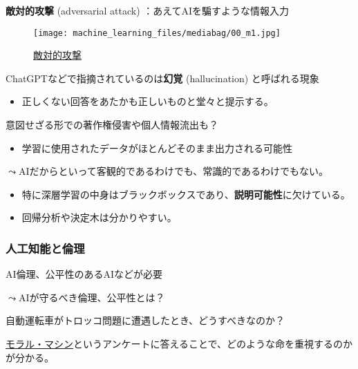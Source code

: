 \documentclass[
  xelatex,
  ja=standard]{bxjsarticle}
\providecommand{\tightlist}{%
  \setlength{\itemsep}{0pt}\setlength{\parskip}{0pt}}\usepackage{longtable,booktabs,array}
\begin{document}
\textbf{敵対的攻撃} (adversarial attack) ：あえてAIを騙すような情報入力

\begin{figure}[htpb]

{\centering \texttt{[image: machine\_learning\_files/mediabag/00\_m1.jpg]}

}

\caption{\href{https://gigazine.net/news/20211130-universal-naturalistic-adversarial-patches/}{敵対的攻撃}}

\end{figure}

ChatGPTなどで指摘されているのは\textbf{幻覚} (hallucination)
と呼ばれる現象

\begin{itemize}
\tightlist
\item
  正しくない回答をあたかも正しいものと堂々と提示する。
\end{itemize}

意図せざる形での著作権侵害や個人情報流出も？

\begin{itemize}
\tightlist
\item
  学習に使用されたデータがほとんどそのまま出力される可能性
\end{itemize}

\(\leadsto\)AIだからといって客観的であるわけでも、常識的であるわけでもない。

\begin{itemize}
\tightlist
\item
  特に深層学習の中身はブラックボックスであり、\textbf{説明可能性}に欠けている。
\item
  回帰分析や決定木は分かりやすい。
\end{itemize}

\hypertarget{ux4ebaux5de5ux77e5ux80fdux3068ux502bux7406}{%
\subsubsection{人工知能と倫理}\label{ux4ebaux5de5ux77e5ux80fdux3068ux502bux7406}}

AI倫理、公平性のあるAIなどが必要

\(\leadsto\)AIが守るべき倫理、公平性とは？

自動運転車がトロッコ問題に遭遇したとき、どうすべきなのか？

\href{https://www.moralmachine.net/hl/ja}{モラル・マシン}というアンケートに答えることで、どのような命を重視するのかが分かる。
\end{document}
